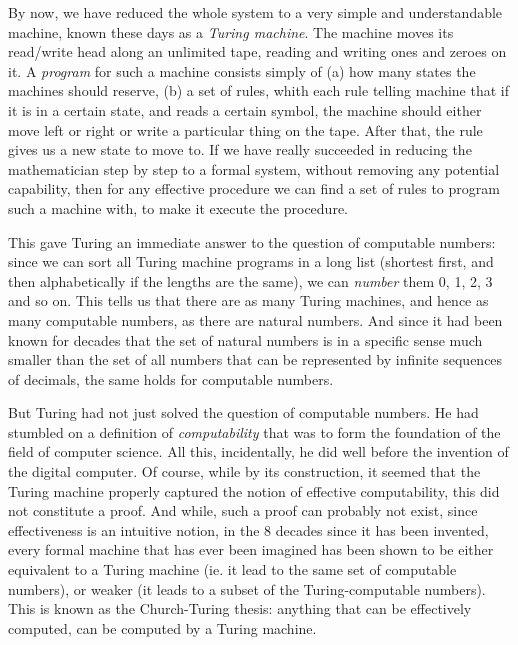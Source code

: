 By now, we have reduced the whole system to a very simple and understandable machine, known these days as a \emph{Turing machine}. The machine moves its read/write head along an unlimited tape, reading and writing ones and zeroes on it. A \emph{program} for such a machine consists simply of (a) how many states the machines should reserve, (b) a set of rules, whith each rule telling machine that if it is in a certain state, and reads a certain symbol, the machine should either move left or right or write a particular thing on the tape. After that, the rule gives us a new state to move to. If we have really succeeded in reducing the mathematician step by step to a formal system, without removing any potential capability, then for any effective procedure we can find a set of rules to program such a machine with, to make it execute the procedure.

This gave Turing an immediate answer to the question of computable numbers: since we can sort all Turing machine programs in a long list (shortest first, and then alphabetically if the lengths are the same), we can \emph{number} them 0, 1, 2, 3 and so on. This tells us that there are as many Turing machines, and hence as many computable numbers, as there are natural numbers. And since it had been known for decades that the set of natural numbers is in a specific sense much smaller than the set of all numbers that can be represented by infinite sequences of decimals, the same holds for computable numbers. 

But Turing had not just solved the question of computable numbers. He had stumbled on a definition of \emph{computability} that was to form the foundation of the field of computer science. All this, incidentally, he did well before the invention of the digital computer. Of course, while by its construction, it seemed that the Turing machine properly captured the notion of effective computability, this did not constitute a proof. And while, such a proof can probably not exist, since effectiveness is an intuitive notion, in the 8 decades since it has been invented, every formal machine that has ever been imagined has been shown to be either equivalent to a Turing machine (ie. it lead to the same set of computable numbers), or weaker (it leads to a subset of the Turing-computable numbers). This is known as the Church-Turing thesis: anything that can be effectively computed, can be computed by a Turing machine. 


